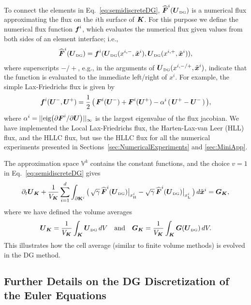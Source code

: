 \documentclass[10pt,preprint]{aastex}
\newcommand{\pbK}{\partial\mathbf{K}}
\newcommand{\sumx}{\sum_{i=1}^{d}}
\begin{document}
To connect the elements in Eq.~\eqref{eq:semidiscreteDG}, $\widehat{\boldsymbol{F}}^{i}(\boldsymbol{U}_{\mbox{\tiny DG}})$ is a numerical flux approximating the flux on the $i$th surface of $\boldsymbol{K}$.  
For this purpose we define the numerical flux function $\boldsymbol{f}^{i}$, which evaluates the numerical flux given values from both sides of an element interface; i.e.,
\begin{equation}
  \widehat{\boldsymbol{F}}^{i}(\boldsymbol{U}_{\mbox{\tiny DG}})=\boldsymbol{f}^{i}(\boldsymbol{U}_{\mbox{\tiny DG}}(x^{i,-},\tilde{\boldsymbol{x}}^{i}),\boldsymbol{U}_{\mbox{\tiny DG}}(x^{i,+},\tilde{\boldsymbol{x}}^{i})),
\end{equation}
where superscripts $-/+$, e.g., in the arguments of $\boldsymbol{U}_{\mbox{\tiny DG}}(x^{i,-/+},\tilde{\boldsymbol{x}}^{i})$, indicate that the function is evaluated to the immediate left/right of $x^{i}$.  
For example, the simple Lax-Friedrichs flux is given by
\begin{equation}
  \boldsymbol{f}^{i}(\boldsymbol{U}^{-},\boldsymbol{U}^{+})
  =\frac{1}{2}\,\big(\,\boldsymbol{F}^{i}(\boldsymbol{U}^{-})+\boldsymbol{F}^{i}(\boldsymbol{U}^{+})-\alpha^{i}\,(\,\boldsymbol{U}^{+}-\boldsymbol{U}^{-}\,)\,\big),
\end{equation}
where $\alpha^{i}=||\mbox{eig}\big(\partial\boldsymbol{F}^{i}/\partial\boldsymbol{U}\big)||_{\infty}$ is the largest eigenvalue of the flux jacobian.  
We have implemented the Local Lax-Friedrichs flux, the Harten-Lax-van Leer (HLL) flux, and the HLLC flux, but use the HLLC flux for all the numerical experiments presented in Sections~\ref{sec:NumericalExperiments} and \ref{sec:MiniApp}.  

The approximation space $\mathbb{V}^{k}$ contains the constant functions, and the choice $v=1$ in Eq.~\eqref{eq:semidiscreteDG} gives
\begin{equation}
  \partial_{t}\bU_{\bK}
  +\f{1}{V_{\bK}}\sumx\int_{\pbK^{i}}\big(\,\sqrt{\gamma}\,\widehat{\vect{F}}^{i}(\bU_{\DG})\big|_{\xH^{i}}-\sqrt{\gamma}\,\widehat{\vect{F}}^{i}(\bU_{\DG})\big|_{\xL^{i}}\,\big)\,d\tilde{\bx}^{i}
  =\bG_{\bK},
\end{equation}
where we have defined the volume averages
\begin{equation}
  \boldsymbol{U}_{\boldsymbol{K}}=\frac{1}{V_{\boldsymbol{K}}}\int_{\boldsymbol{K}}\boldsymbol{U}_{\mbox{\tiny DG}}\,dV \quad\text{and}\quad
  \boldsymbol{G}_{\boldsymbol{K}}=\frac{1}{V_{\boldsymbol{K}}}\int_{\boldsymbol{K}}\boldsymbol{G}(\boldsymbol{U}_{\mbox{\tiny DG}})\,dV.  
\end{equation}
This illustrates how the cell average (similar to finite volume methods) is evolved in the DG method.  

\subsection{Further Details on the DG Discretization of the Euler Equations}
\end{document}
